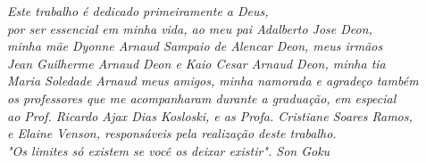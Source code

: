 \begin{dedicatoria}
   \vspace*{\fill}
   \centering
   \noindent

   \textit{Este trabalho é dedicado primeiramente a Deus,\\
   por ser essencial em minha vida, ao meu pai Adalberto Jose Deon, \\
   minha mãe Dyonne Arnaud Sampaio de Alencar Deon, meus irmãos \\
   Jean Guilherme Arnaud Deon e Kaio Cesar Arnaud Deon, minha tia \\
   Maria Soledade Arnaud meus amigos, minha namorada e agradeço também \\
   os professores que me acompanharam durante a graduação, em especial \\
   ao Prof. Ricardo Ajax Dias Kosloski, e as Profa. Cristiane Soares Ramos, \\
   e Elaine Venson, responsáveis pela realização deste trabalho. \\
   "Os limites só existem se você os deixar existir". Son Goku} \vspace*{\fill}
\end{dedicatoria}
